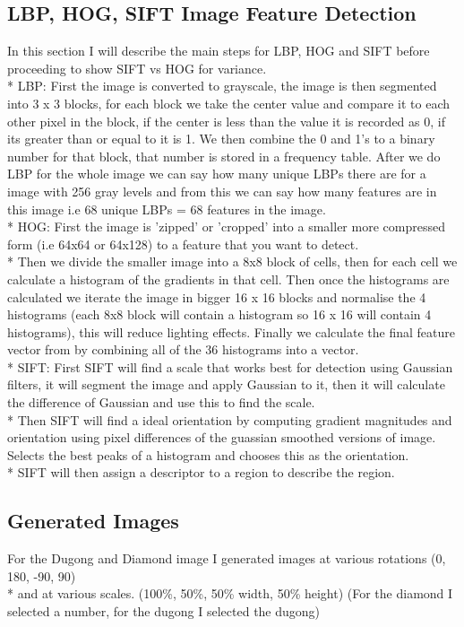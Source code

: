 \documentclass[conference]{IEEEtran}
\begin{document}
\subsection{LBP, HOG, SIFT Image Feature Detection}
In this section I will describe the main steps for LBP, HOG and SIFT before proceeding to show SIFT vs HOG for variance.\\*
LBP: First the image is converted to grayscale, the image is then segmented into 3 x 3 blocks, for each block we take the center value and compare it to each other pixel in the block, if the center is less than the value it is recorded as 0, if its greater than or equal to it is 1.
We then combine the 0 and 1's to a binary number for that block, that number is stored in a frequency table. After we do LBP for the whole image we can say how many unique LBPs there are for a image with 256 gray levels and from this we can say how many features are in this image i.e
68 unique LBPs = 68 features in the image.\\*
HOG: First the image is 'zipped' or 'cropped' into a smaller more compressed form (i.e 64x64 or 64x128) to a feature that you want to detect.\\*
Then we divide the smaller image into a 8x8 block of cells, then for each cell we calculate a histogram of the gradients in that cell.
Then once the histograms are calculated we iterate the image in bigger 16 x 16 blocks and normalise the 4 histograms (each 8x8 block will contain a histogram so 16 x 16 will contain 4 histograms), this will reduce lighting effects.
Finally we calculate the final feature vector from by combining all of the 36 histograms into a vector.\\*
SIFT: First SIFT will find a scale that works best for detection using Gaussian filters, it will segment the image and apply Gaussian to it, then it will calculate the difference of Gaussian and use this to find the scale.\\*
Then SIFT will find a ideal orientation by computing gradient magnitudes and orientation using pixel differences of the guassian smoothed versions of image.
Selects the best peaks of a histogram and chooses this as the orientation.\\*
SIFT will then assign a descriptor to a region to describe the region.
\subsection{Generated Images}
For the Dugong and Diamond image I generated images at various rotations (0\degree, 180\degree, -90\degree, 90\degree)\\*
and at various scales. (100\%, 50\%, 50\% width, 50\% height) (For the diamond I selected a number, for the dugong I selected the dugong)
\end{document}
